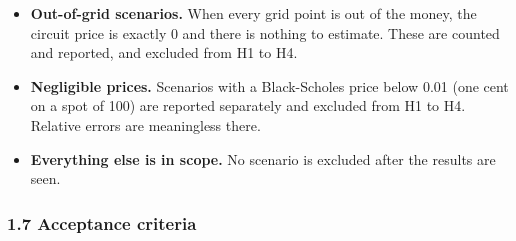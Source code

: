 \documentclass[
  10pt,
]{article}
\providecommand{\tightlist}{%
  \setlength{\itemsep}{0pt}\setlength{\parskip}{0pt}}
\begin{document}
\begin{itemize}
\tightlist
\item
  \textbf{Out-of-grid scenarios.} When every grid point is out of the
  money, the circuit price is exactly 0 and there is nothing to
  estimate. These are counted and reported, and excluded from H1 to H4.
\item
  \textbf{Negligible prices.} Scenarios with a Black-Scholes price below
  0.01 (one cent on a spot of 100) are reported separately and excluded
  from H1 to H4. Relative errors are meaningless there.
\item
  \textbf{Everything else is in scope.} No scenario is excluded after
  the results are seen.
\end{itemize}

\hypertarget{17-acceptance-criteria}{%
\subsubsection{1.7 Acceptance criteria}\label{17-acceptance-criteria}}
\end{document}
